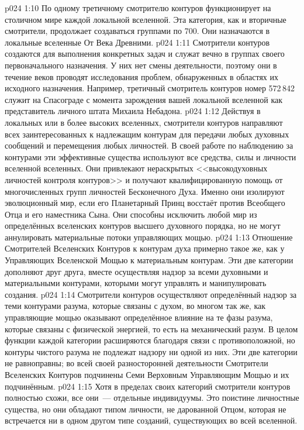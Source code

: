 \vs p024 1:10 По одному третичному смотрителю контуров функционирует на столичном мире каждой локальной вселенной. Эта категория, как и вторичные смотрители, продолжает создаваться группами по 700. Они назначаются в локальные вселенные От Века Древними.
\vs p024 1:11 Смотрители контуров создаются для выполнения конкретных задач и служат вечно в группах своего первоначального назначения. У них нет смены деятельности, поэтому они в течение веков проводят исследования проблем, обнаруженных в областях их исходного назначения. Например, третичный смотритель контуров номер 572\,842 служит на Спасограде с момента зарождения вашей локальной вселенной как представитель личного штата Михаила Небадона.
\vs p024 1:12 \pc Действуя в локальных или в более высоких вселенных, смотрители контуров направляют всех заинтересованных к надлежащим контурам для передачи любых духовных сообщений и перемещения любых личностей. В своей работе по наблюдению за контурами эти эффективные существа используют все средства, силы и личности вселенной вселенных. Они привлекают нераскрытых <<высокодуховных личностей контроля контуров>> и получают квалифицированную помощь от многочисленных групп личностей Бесконечного Духа. Именно они изолируют эволюционный мир, если его Планетарный Принц восстаёт против Всеобщего Отца и его наместника Сына. Они способны исключить любой мир из определённых вселенских контуров высшего духовного порядка, но не могут аннулировать материальные потоки управляющих мощью.
\vs p024 1:13 \pc Отношение Смотрителей Вселенских Контуров к контурам духа примерно такое же, как у Управляющих Вселенской Мощью к материальным контурам. Эти две категории дополняют друг друга, вместе осуществляя надзор за всеми духовными и материальными контурами, которыми могут управлять и манипулировать создания.
\vs p024 1:14 Смотрители контуров осуществляют определённый надзор за теми контурами разума, которые связаны с духом, во многом так же, как управляющие мощью оказывают определённое влияние на те фазы разума, которые связаны с физической энергией, то есть на механический разум. В целом функции каждой категории расширяются благодаря связи с противоположной, но контуры чистого разума не подлежат надзору ни одной из них. Эти две категории не равноправны; во всей своей разносторонней деятельности Смотрители Вселенских Контуров подчинены Семи Верховным Управляющим Мощью и их подчинённым.
\vs p024 1:15 \pc Хотя в пределах своих категорий смотрители контуров полностью схожи, все они~--- отдельные индивидуумы. Это поистине личностные существа, но они обладают типом личности, не дарованной Отцом, которая не встречается ни в одном другом типе созданий, существующих во всей вселенной.
